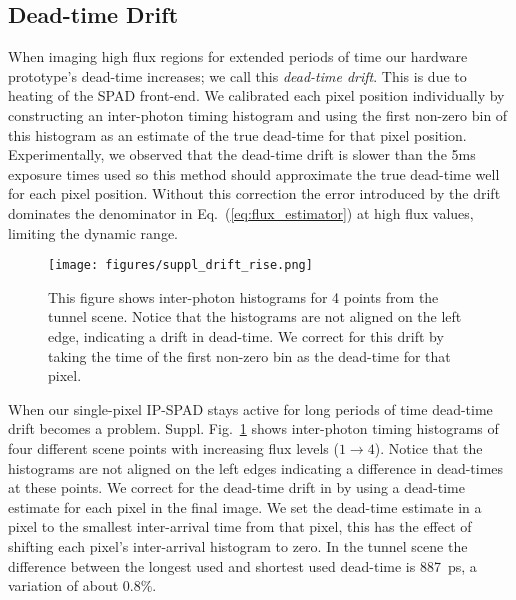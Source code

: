 \subsection*{Dead-time Drift}\label{suppl:dead time drift}
When imaging high flux regions for extended periods of time our hardware
prototype's dead-time increases; we call this \textit{dead-time drift}.  This
is due to heating of the SPAD front-end. We calibrated each pixel position
individually by constructing an inter-photon timing histogram and using the
first non-zero bin of this histogram as an estimate of the true dead-time for
that pixel position. Experimentally, we observed that the dead-time drift is
slower than the 5ms exposure times used so this method should approximate the
true dead-time well for each pixel position. Without this correction the error
introduced by the drift dominates the denominator in
Eq.~(\ref{eq:flux_estimator}) at high flux values, limiting the dynamic range.

\begin{figure}[!ht]
  \centering \texttt{[image: figures/suppl\_drift\_rise.png]}
  \caption{This figure shows inter-photon histograms for 4 points from the
    tunnel scene.  Notice that the histograms are not aligned on the left edge,
    indicating a drift in dead-time. We correct for this drift by taking the
    time of the first non-zero bin as the dead-time for that pixel.
    \label{suppl_fig:drift_rise}}
\end{figure}

When our single-pixel IP-SPAD stays active for long periods of time dead-time
drift becomes a problem. Suppl. Fig.~\ref{suppl_fig:drift_rise} shows
inter-photon timing histograms of four different scene points with increasing
flux levels ($1\rightarrow 4$). Notice that the histograms are not aligned on
the left edges indicating a difference in dead-times at these points. We
correct for the dead-time drift in by using a dead-time estimate for each pixel
in the final image. We set the dead-time estimate in a pixel to the smallest
inter-arrival time from that pixel, this has the effect of shifting each
pixel's inter-arrival histogram to zero.  In the tunnel scene the difference
between the longest used and shortest used dead-time is \SI{887}{\pico\second},
a variation of about 0.8\%.

